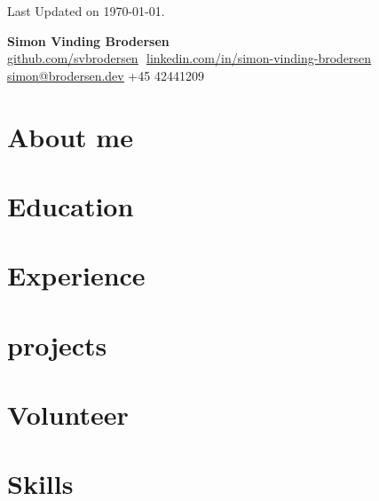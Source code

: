 \documentclass[letterpaper,11pt]{article}
\begin{document}
\begin{flushright}
	\color{gray}
	\item
	Last Updated on \today.
\end{flushright}

\vspace{-5pt}

\begin{center}
	\textbf{\Huge Simon Vinding Brodersen} \\ \vspace{8pt}
	\footnotesize
	\href{https://github.com/svbrodersen}{\underline{github.com/svbrodersen}} $  $
	\href{https://www.linkedin.com/in/simon-vinding-brodersen/}{\underline{linkedin.com/in/simon-vinding-brodersen}} $  $
	\href{mailto:simon@broderse.dev}
	{\underline{simon@brodersen.dev}}
	+45 42441209
\end{center}

\section{About me}


\section{Education}


\section{Experience}


\section{projects}


\section{Volunteer}


\section{Skills}

\end{document}
